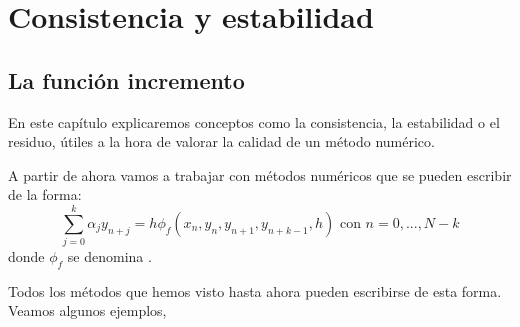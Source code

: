 
\chapter{Consistencia y estabilidad}
\section{La función incremento}
En este capítulo explicaremos conceptos como la consistencia, la estabilidad o el residuo, útiles a la hora de valorar la calidad de un método numérico.

A partir de ahora vamos a trabajar con métodos numéricos que se pueden escribir de la forma:
\[\sum_{j=0}^k α_jy_{n+j} = h \phi_f(x_n,y_n,y_{n+1},y_{n+k-1},h) \text{ con } n=0,...,N - k\]
donde $\phi_f$ se denomina .

\obs Todos los métodos que hemos visto hasta ahora pueden escribirse de esta forma. Veamos algunos ejemplos,

